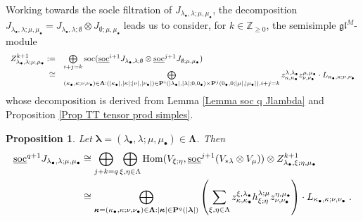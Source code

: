 \documentclass[12pt]{article}
\def\ZZ {{\mathbb Z}}     %
\def\mk {\mathfrak}
\def\ul  {\underline}
\newtheorem{prop}[theorem]{Proposition}
\begin{document}
Working towards the socle filtration of $J_{\lambda_\bullet,\lambda;\mu,\mu_\bullet}$, the decomposition $J_{\lambda_\bullet,\lambda;\mu,\mu_\bullet}=J_{\lambda_\bullet,\lambda;\emptyset}\otimes J_{\emptyset;\mu,\mu_\bullet}$ leads us to consider, for $k\in\ZZ_{\geq0}$, the semisimple $\mk{gl}^M$-module
\begin{gather}\label{For module Sk}
\begin{array}{rl}
Z^{k+1}_{\lambda_\bullet,\lambda;\mu,\mu_\bullet} :=& \bigoplus\limits_{i+j=k} {\rm soc}(\ul{\rm soc}^{i+1}J_{\lambda_\bullet,\lambda;\emptyset}\otimes\ul{\rm soc}^{j+1}J_{\emptyset;\mu,\mu_\bullet}) \\
\cong & \bigoplus\limits_{(\kappa_\bullet,\kappa;\nu,\nu_\bullet)\in\bm\Lambda:(|\kappa_\bullet|,|\kappa|;|\nu|,|\nu_\bullet|)\in{\bf P}^i(|\lambda_\bullet|,|\lambda|;0,0_\bullet)\times{\bf P}^j(0_\bullet,0;|\mu|,|\mu_\bullet|),i+j=k} z^{\lambda,\lambda_\bullet}_{\kappa,\kappa_\bullet} z^{\mu,\mu_\bullet}_{\nu,\nu_\bullet} \cdot L_{\kappa_\bullet,\kappa;\nu,\nu_\bullet}
\end{array} 
\end{gather}
whose decomposition is derived from Lemma \ref{Lemma soc q Jlambda} and Proposition \ref{Prop TT tensor prod simples}.

\begin{prop}\label{Prop soc q Jlambdamu}
Let $\bm\lambda=(\lambda_\bullet,\lambda;\mu,\mu_\bullet)\in \bm\Lambda$. Then
\begin{align*}
\ul{\rm soc}^{q+1}J_{\lambda_\bullet,\lambda;\mu,\mu_\bullet} & \cong \bigoplus\limits_{j+k=q} \bigoplus\limits_{\xi,\eta\in\Lambda} {\rm Hom}(V_{\xi;\eta},\ul{\rm soc}^{j+1}(V_{*\lambda}\otimes V_{\mu}))\otimes Z^{k+1}_{\lambda_{\bullet},\xi;\eta,\mu_{\bullet}} \\
& \cong \bigoplus\limits_{\bm\kappa=(\kappa_\bullet,\kappa;\nu,\nu_\bullet)\in\bm\Lambda:|\bm\kappa|\in{\bf P}^q(|\bm\lambda|)} \left( \sum\limits_{\xi,\eta\in\Lambda} z^{\xi,\lambda_{\bullet}}_{\kappa,\kappa_\bullet} h^{\lambda;\mu}_{\xi;\eta} z^{\eta,\mu_{\bullet}}_{\nu,\nu_\bullet} \right) \cdot L_{\kappa_\bullet,\kappa;\nu,\nu_\bullet} \;.
\end{align*}
\end{prop}
\end{document}
